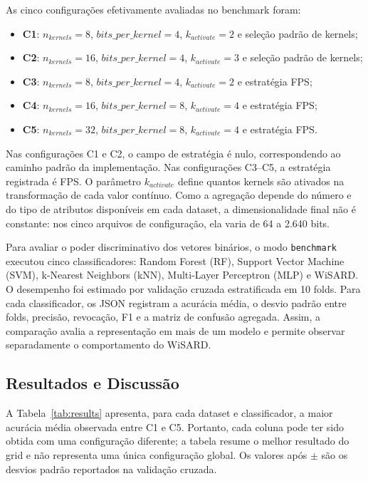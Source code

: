 \documentclass[12pt]{article}
\begin{document}
As cinco configurações efetivamente avaliadas no benchmark foram:
\begin{itemize}
    \item \textbf{C1}: $n_{kernels}=8$, $bits\_per\_kernel=4$, $k_{activate}=2$ e seleção padrão de kernels;
    \item \textbf{C2}: $n_{kernels}=16$, $bits\_per\_kernel=4$, $k_{activate}=3$ e seleção padrão de kernels;
    \item \textbf{C3}: $n_{kernels}=8$, $bits\_per\_kernel=4$, $k_{activate}=2$ e estratégia FPS;
    \item \textbf{C4}: $n_{kernels}=16$, $bits\_per\_kernel=8$, $k_{activate}=4$ e estratégia FPS;
    \item \textbf{C5}: $n_{kernels}=32$, $bits\_per\_kernel=8$, $k_{activate}=4$ e estratégia FPS.
\end{itemize}

Nas configurações C1 e C2, o campo de estratégia é nulo, correspondendo ao caminho padrão da implementação. Nas configurações C3--C5, a estratégia registrada é FPS. O parâmetro $k_{activate}$ define quantos kernels são ativados na transformação de cada valor contínuo. Como a agregação depende do número e do tipo de atributos disponíveis em cada dataset, a dimensionalidade final não é constante: nos cinco arquivos de configuração, ela varia de 64 a 2.640 bits.

Para avaliar o poder discriminativo dos vetores binários, o modo \texttt{benchmark} executou cinco classificadores: Random Forest (RF), Support Vector Machine (SVM), k-Nearest Neighbors (kNN), Multi-Layer Perceptron (MLP) e WiSARD. O desempenho foi estimado por validação cruzada estratificada em 10 folds. Para cada classificador, os JSON registram a acurácia média, o desvio padrão entre folds, precisão, revocação, F1 e a matriz de confusão agregada. Assim, a comparação avalia a representação em mais de um modelo e permite observar separadamente o comportamento do WiSARD.

\subsection{Resultados e Discussão}

A Tabela~\ref{tab:results} apresenta, para cada dataset e classificador, a maior acurácia média observada entre C1 e C5. Portanto, cada coluna pode ter sido obtida com uma configuração diferente; a tabela resume o melhor resultado do grid e não representa uma única configuração global. Os valores após $\pm$ são os desvios padrão reportados na validação cruzada.
\end{document}
